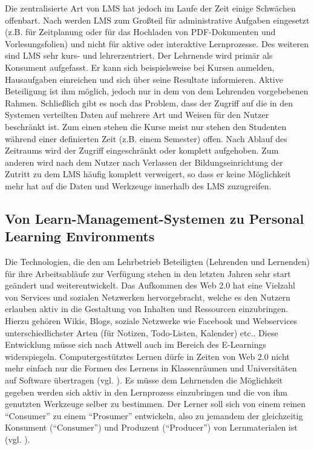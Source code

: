Die zentralisierte Art von LMS hat jedoch im Laufe der Zeit einige Schwächen offenbart. Nach \cite{Mott2010} werden LMS zum Großteil für administrative Aufgaben eingesetzt (z.B. für Zeitplanung oder für das Hochladen von PDF-Dokumenten und Vorlesungsfolien) und nicht für aktive oder interaktive Lernprozesse. Des weiteren sind LMS sehr kurs- und lehrerzentriert. Der Lehrnende wird primär als Konsument aufgefasst. Er kann sich beispielsweise bei Kursen anmelden, Hausaufgaben einreichen und sich über seine Resultate informieren. Aktive Beteiligung ist ihm möglich, jedoch nur in dem von dem Lehrenden vorgebebenen Rahmen.
Schließlich gibt es noch das Problem, dass der Zugriff auf die in den Systemen verteilten Daten auf mehrere Art und Weisen für den Nutzer beschränkt ist. Zum einen stehen die Kurse meist nur stehen den Studenten während einer definierten Zeit (z.B. einem Semester) offen. Nach Ablauf des Zeitraums wird der Zugriff eingeschränkt oder komplett aufgehoben. Zum anderen wird nach \cite{Schaffert2008a} dem Nutzer nach Verlassen der Bildungseinrichtung der Zutritt zu dem LMS häufig komplett verweigert, so dass er keine Möglichkeit mehr hat auf die Daten und Werkzeuge innerhalb des LMS zuzugreifen.

\subsection{Von Learn-Management-Systemen zu Personal Learning Environments}\label{section:von_lms_zu_ple}
Die Technologien, die den am Lehrbetrieb Beteiligten (Lehrenden und Lernenden) für ihre Arbeitsabläufe zur Verfügung stehen in den letzten Jahren sehr start geändert und weiterentwickelt. Das Aufkommen des Web 2.0 hat eine Vielzahl von Services und sozialen Netzwerken hervorgebracht, welche es den Nutzern erlauben aktiv in die Gestaltung von Inhalten und Ressourcen einzubringen. Hierzu gehören Wikis, Blogs, soziale Netzwerke wie Facebook und Webservices unterschiedlichster Arten (für Notizen, Todo-Listen, Kalender) etc..
Diese Entwicklung müsse sich nach Attwell auch im Bereich des E-Learnings widerspiegeln. Computergestütztes Lernen dürfe in Zeiten von Web 2.0 nicht mehr einfach nur die Formen des Lernens in Klassenräumen und Universitäten auf Software übertragen (vgl. \cite{Attwell2007}). Es müsse dem Lehrnenden die Möglichkeit gegeben werden sich aktiv in den Lernprozess einzubringen und die von ihm genutzten Werkzeuge selber zu bestimmen. Der Lerner soll sich von einem reinen "`Consumer"' zu einem "`Prosumer"' entwickeln, also zu jemandem der gleichzeitig Konsument ("`Consumer"') und Produzent ("`Producer"') von Lernmaterialen ist (vgl. \cite{Schaffert2008a}).  

